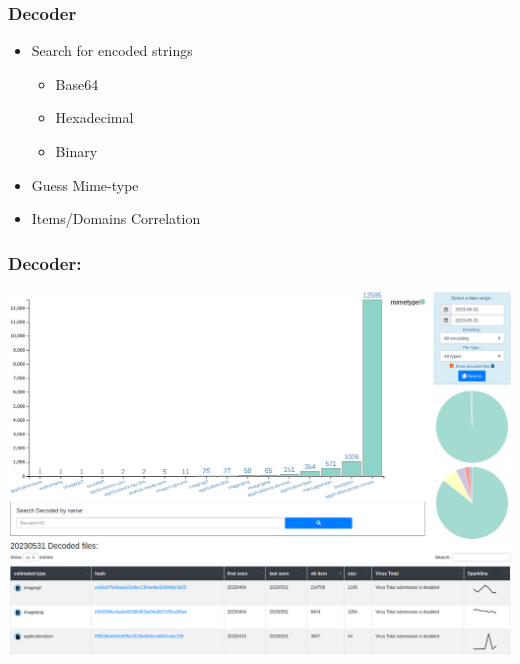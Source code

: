 \documentclass[aspectratio=169]{beamer}
\begin{document}

\begin{frame}
    \frametitle{Decoder}
    \begin{itemize}
    	\item Search for encoded strings
    		\begin{itemize}
				\item Base64
				\item Hexadecimal
				\item Binary
			\end{itemize}
    	\item Guess Mime-type
    	\item Items/Domains Correlation
    \end{itemize}
\end{frame}


\begin{frame}
    \frametitle{Decoder:}
    \centerline{
        \includegraphics[scale=0.23]{screenshot/decodeds_dashboard.png}
    }
\end{frame}
\end{document}

